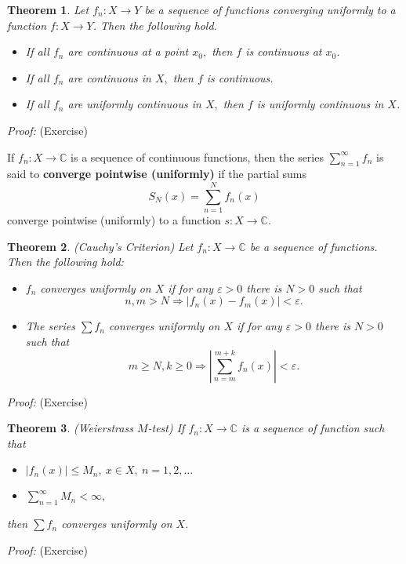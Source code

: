 \documentclass[12pt]{report}
\newtheorem{theorem}{Theorem}[section]
\begin{document}
\begin{theorem}
\label{th:unif-conv-cont}  
Let $f_n: X \longrightarrow Y$ be a
sequence of functions converging uniformly to a function $ f: X
\longrightarrow Y$.  Then the following hold.
\begin{itemize}
\item[(1)]  If all $f_n$ are continuous at a point $x_0,$ then
$f$ is continuous at
$x_0$.
\item[(2)]  If all $f_n$ are continuous in $X,$ then $f$ is
continuous.
\item[(3)]  If all $f_n$ are uniformly continuous in $X,$ then $f$
is uniformly continuous in $X$.
\end{itemize}
\end{theorem}
\textit{Proof:} (Exercise)

\medskip
\noindent
If $f_n: X \longrightarrow \mathbb{C}$ is a sequence of
continuous functions, then the series $\sum\limits^\infty_{n=1} f_n$
is said to {\bf converge pointwise (uniformly)} if the partial sums
\[ S_N (x) = \sum^N_{n=1} f_n (x)
\]  converge pointwise (uniformly) to a function $ s: X
\longrightarrow
\mathbb{C}$.


\begin{theorem}
\label{th:Cauchy-Criterion} (Cauchy's Criterion) 
 Let $f_n: X
\longrightarrow
\mathbb{C}$ be a sequence of functions.  Then the following hold:
\begin{itemize}
\item[(1)]   $f_n$ converges uniformly on $X$ if for any
$\varepsilon > 0 $ there is $N > 0$ such that
\[ n, m > N \Longrightarrow |f_n(x) - f_m(x) | < \varepsilon.
\]
\item[(2)]  The series $\sum f_n$ converges uniformly on $X$
if for any
$\varepsilon > 0 $ there is $N > 0$ such that
\[ m \ge N, k \ge 0 \Longrightarrow \left | \sum^{m+k}_{n=m} f_n (x)
\right | <
\varepsilon.
\]
\end{itemize}
\end{theorem}
\textit{Proof:} (Exercise) 

\begin{theorem}
\label{th:Weierstrass-Mtest}
(Weierstrass $M$-test)     
If $f_n: X
\longrightarrow
\mathbb{C}$ is a sequence of function such that

\begin{itemize}
\item[(a)]  $|f_n(x)| \le M_n, \ x \in X, \ n = 1, 2, \dots$
\item[(b)]  $\sum\limits^\infty_{n=1} M_n < \infty,$
\end{itemize}
then $\sum f_n$ converges uniformly on $X$.
\end{theorem}
\textit{Proof:} (Exercise) 
\end{document}
